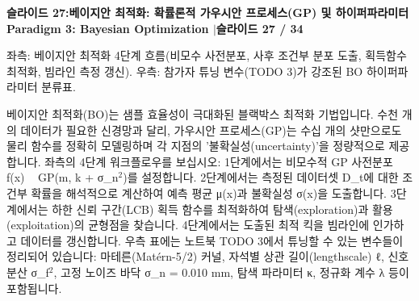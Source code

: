 \documentclass[11pt,a4paper]{article}
\begin{document}
\clearpage
\hypertarget{slide.27}{}
{}
\noindent\begin{tcolorbox}[colback=navy,colframe=navy,left=6pt,right=6pt,top=3pt,bottom=3pt,boxrule=0pt,arc=2pt]
{\large\bfseries\color{white}슬라이드 27:\enspace 베이지안 최적화: 확률론적 가우시안 프로세스(GP) 및 하이퍼파라미터}\hfill{\footnotesize\bfseries\color{white!85!lightbg}Paradigm 3: Bayesian Optimization \enspace$|$\enspace 슬라이드 27 / 34}
\end{tcolorbox}
\vspace{0.2em}
\begin{tcolorbox}[colback=lightbg,colframe=bordergray,title={\footnotesize\bfseries\color{darkgray}슬라이드 시각 구성 요약},fontupper=\small,left=6pt,right=6pt,top=2.5pt,bottom=2.5pt,boxrule=0.6pt,arc=2.5pt]
좌측: 베이지안 최적화 4단계 흐름(비모수 사전분포, 사후 조건부 분포 도출, 획득함수 최적화, 빔라인 측정 갱신). 우측: 참가자 튜닝 변수(TODO 3)가 강조된 BO 하이퍼파라미터 분류표.
\end{tcolorbox}
\vspace{0.2em}
\begin{tcolorbox}[colback=white,colframe=primaryblue,title={\footnotesize\bfseries\color{white}발표자 구두 대본 (Spoken Script)},fontupper=\small,left=6pt,right=6pt,top=3pt,bottom=3pt,boxrule=0.8pt,arc=2.5pt]
베이지안 최적화(BO)는 샘플 효율성이 극대화된 블랙박스 최적화 기법입니다. 수천 개의 데이터가 필요한 신경망과 달리, 가우시안 프로세스(GP)는 수십 개의 샷만으로도 물리 함수를 정확히 모델링하며 각 지점의 '불확실성(uncertainty)'을 정량적으로 제공합니다. 좌측의 4단계 워크플로우를 보십시오: 1단계에서는 비모수적 GP 사전분포 f(x) ~ GP(m, k + σ\_n$^2$)를 설정합니다. 2단계에서는 측정된 데이터셋 D\_t에 대한 조건부 확률을 해석적으로 계산하여 예측 평균 μ(x)과 불확실성 σ(x)을 도출합니다. 3단계에서는 하한 신뢰 구간(LCB) 획득 함수를 최적화하여 탐색(exploration)과 활용(exploitation)의 균형점을 찾습니다. 4단계에서는 도출된 최적 킥을 빔라인에 인가하고 데이터를 갱신합니다. 우측 표에는 노트북 TODO 3에서 튜닝할 수 있는 변수들이 정리되어 있습니다: 마테른(Matérn-5/2) 커널, 자석별 상관 길이(lengthscale) ℓ, 신호 분산 σ\_f$^2$, 고정 노이즈 바닥 σ\_n = 0.010 mm, 탐색 파라미터 κ, 정규화 계수 λ 등이 포함됩니다.
\end{tcolorbox}
\vspace{0.2em}
\end{document}
